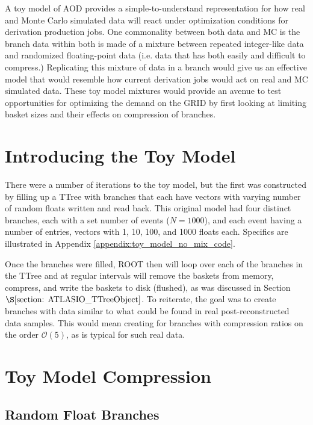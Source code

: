 A toy model of AOD provides a simple-to-understand representation for how real and Monte Carlo simulated data will react under optimization conditions for derivation production jobs. 
One commonality between both data and MC is the branch data within both is made of a mixture between repeated integer-like data and randomized floating-point data (i.e. data that has both easily and difficult to compress.)
Replicating this mixture of data in a branch would give us an effective model that would resemble how current derivation jobs would act on real and MC simulated data. 
These toy model mixtures would provide an avenue to test opportunities for optimizing the demand on the GRID by first looking at limiting basket sizes and their effects on compression of branches. 

\section{Introducing the Toy Model}

There were a number of iterations to the toy model, but the first was constructed by filling up a TTree with branches that each have vectors with varying number of random floats written and read back.
This original model had four distinct branches, each with a set number of events ($N=1000$), and each event having a number of entries, vectors with 1, 10, 100, and 1000 floats each.
Specifics are illustrated in Appendix \ref{appendix:toy_model_no_mix_code}.

Once the branches were filled, ROOT then will loop over each of the branches in the TTree and at regular intervals will remove the baskets from memory, compress, and write the baskets to disk (flushed), as was discussed in Section $\S \ref{section: ATLASIO_TTreeObject}$.
To reiterate, the goal was to create branches with data similar to what could be found in real post-reconstructed data samples.
This would mean creating for branches with compression ratios on the order $\mathcal{O}(5)$, as is typical for such real data. 


\section{Toy Model Compression}

\subsection{Random Float Branches}

